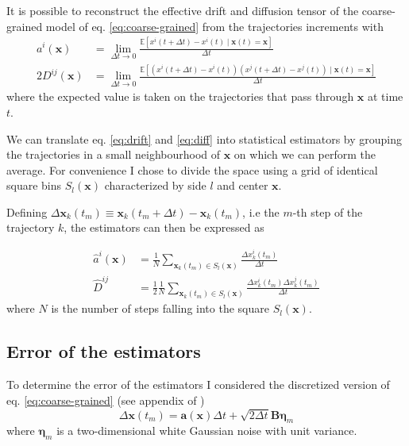 \documentclass[a4paper]{article}
\begin{document}
It is possible to reconstruct the effective drift and diffusion tensor of the coarse-grained model of eq. \ref{eq:coarse-grained} from the trajectories increments \cite{hoze2014} \cite{schuss} with
\begin{align}
a^i(\bm{x}) &= \lim_{\Delta t \to 0}\frac{\mathbb{E}\left[x^i(t + \Delta t) - x^i(t) \mid \bm{x}(t) = \bm{x}\right]}{\Delta t} \label{eq:drift}\\[10pt]
2D^{ij}(\bm{x}) &= \lim_{\Delta t \to 0}\frac{\mathbb{E}\left[\left(x^i(t + \Delta t) - x^i(t)\right)\left(x^j(t + \Delta t) - x^j(t)\right) \mid \bm{x}(t) = \bm{x}\right]}{\Delta t} \label{eq:diff}
\end{align}
where the expected value is taken on the trajectories that pass through $\bm{x}$ at time $t$.

We can translate eq. \ref{eq:drift} and \ref{eq:diff} into statistical estimators by grouping the trajectories in a small neighbourhood of $\bm{x}$ on which we can perform the average. For convenience I chose to divide the space using a grid of identical square bins $S_l(\bm{x})$ characterized by side $l$ and center $\bm{x}$.

Defining $\Delta \bm{x}_k(t_m) \equiv \bm{x}_k(t_m + \Delta t) - \bm{x}_k(t_m)$, i.e the $m$-th step of the trajectory $k$, the estimators can then be expressed as

\begin{align}
\hat{a}^i({\bm{x}}) &= \frac{1}{N} \sum_{\bm{x}_k(t_m) \in S_l(\bm{x})} \frac{\Delta x_k^i(t_m)}{\Delta t} \label{eq:drift-estimator} \\[10pt]
\hat{D}^{ij} &= \frac{1}{2} \frac{1}{N} \sum_{\bm{x}_k(t_m) \in S_l(\bm{x})}\frac{\Delta x_k^i(t_m) \Delta x_k^j(t_m)}{\Delta t} \label{eq:diff-estimator}
\end{align}
where $N$ is the number of steps falling into the square $S_l(\bm{x})$.

\subsection{Error of the estimators}

To determine the error of the estimators I considered the discretized version of eq. \ref{eq:coarse-grained} (see appendix of \cite{hoze2012})
\begin{equation}
\Delta \bm{x}(t_m) = \bm{a}(\bm{x}) \Delta t + \sqrt{2 \Delta t} \bm{B} \bm{\eta}_m
\end{equation}
where $\bm{\eta}_m$ is a two-dimensional white Gaussian noise with unit variance.
\end{document}
